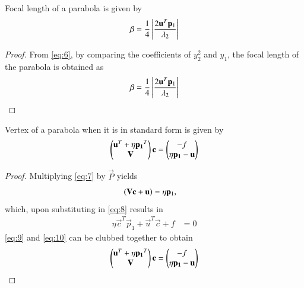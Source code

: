 \documentclass[journal,12pt,twocolumn]{IEEEtran}
\begin{document}
\begin{lemma}
Focal length of a parabola is given by
\begin{align}
\beta = \frac{1}{4}\left\vert\frac{2\mathbf{u}^T\mathbf{p}_1}{\lambda_2}\right\vert 
\label{eq:24} 
\end{align}
\end{lemma}
\begin{proof}
From \eqref{eq:6}, by comparing the coefficients of $y_2^2$ and $y_1$, the focal length of the parabola is obtained as 
\begin{align}
\beta = \frac{1}{4}\left\vert\frac{2\mathbf{u}^T\mathbf{p}_1}{\lambda_2}\right\vert 
\label{eq:16} 
\end{align}
\end{proof}

\begin{lemma}
Vertex of a parabola when it is in standard form is given by 
\begin{align}
\begin{pmatrix}\mathbf{u}^T + \eta\mathbf{p_1}^T \\ \mathbf{V}\end{pmatrix}\mathbf{c} = \begin{pmatrix}-f \\ \eta\mathbf{p_1} - \mathbf{u}\end{pmatrix} \label{eq:28}
\end{align}
\end{lemma}
\begin{proof}
Multiplying \eqref{eq:7} by $\vec{P}$ yields
\begin{align}
\label{eq:9}
\left(\mathbf{V}\mathbf{c}+\mathbf{u}\right) &= \eta\mathbf{p}_1,
\end{align}
which, upon substituting in \eqref{eq:8}
results in 
\begin{align}
\eta\vec{c}^T\vec{p}_1 + \vec{u}^T\vec{c} + f&= 0
\label{eq:10}
\end{align}
\eqref{eq:9} and \eqref{eq:10} can be clubbed together to obtain 
\begin{align}
\begin{pmatrix}\mathbf{u}^T + \eta\mathbf{p_1}^T \\ \mathbf{V}\end{pmatrix}\mathbf{c} = \begin{pmatrix}-f \\ \eta\mathbf{p_1} - \mathbf{u}\end{pmatrix} \label{eq:12}
\end{align}
\end{proof}
\end{document}
